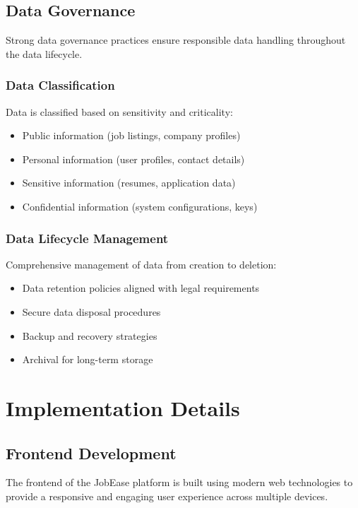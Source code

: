 \documentclass[12pt,a4paper]{report}
\begin{document}
\section{Data Governance}
Strong data governance practices ensure responsible data handling throughout the data lifecycle.

\subsection{Data Classification}
Data is classified based on sensitivity and criticality:
\begin{itemize}[leftmargin=2em]
  \item Public information (job listings, company profiles)
  \item Personal information (user profiles, contact details)
  \item Sensitive information (resumes, application data)
  \item Confidential information (system configurations, keys)
\end{itemize}

\subsection{Data Lifecycle Management}
Comprehensive management of data from creation to deletion:
\begin{itemize}[leftmargin=2em]
  \item Data retention policies aligned with legal requirements
  \item Secure data disposal procedures
  \item Backup and recovery strategies
  \item Archival for long-term storage
\end{itemize}

\chapter{Implementation Details}

\section{Frontend Development}
The frontend of the JobEase platform is built using modern web technologies to provide a responsive and engaging user experience across multiple devices.
\end{document}
